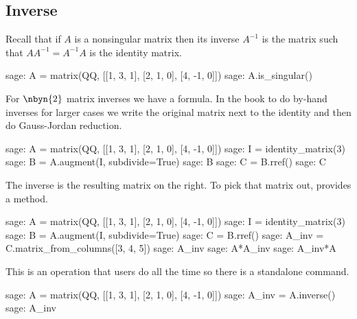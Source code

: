  


\subsection{Inverse}
Recall that if $A$ is a nonsingular matrix then its inverse $A^{-1}$
is the matrix such that $AA^{-1}=A^{-1}A$ is the identity matrix. 
\begin{sagecommandline}
sage: A = matrix(QQ, [[1, 3, 1], [2, 1, 0], [4, -1, 0]])
sage: A.is_singular()
\end{sagecommandline}
For $\nbyn{2}$ matrix inverses we have a formula.
In the book to do by-hand inverses for larger cases 
we write the original matrix next to the identity 
and then do Gauss-Jordan reduction.
\begin{sagecommandline}
sage: A = matrix(QQ, [[1, 3, 1], [2, 1, 0], [4, -1, 0]])
sage: I = identity_matrix(3)
sage: B = A.augment(I, subdivide=True)
sage: B
sage: C = B.rref()
sage: C
\end{sagecommandline}
\noindent
The inverse is the resulting matrix on the right.
To pick that matrix out, 
\Sage{} provides a  method.
\begin{sagecommandline}
sage: A = matrix(QQ, [[1, 3, 1], [2, 1, 0], [4, -1, 0]])
sage: I = identity_matrix(3)
sage: B = A.augment(I, subdivide=True)
sage: C = B.rref()
sage: A_inv = C.matrix_from_columns([3, 4, 5])
sage: A_inv
sage: A*A_inv
sage: A_inv*A
\end{sagecommandline}

This is an operation that \Sage{} users do all the time so there is a
standalone command.
\begin{sagecommandline}[d,0,1]
sage: A = matrix(QQ, [[1, 3, 1], [2, 1, 0], [4, -1, 0]])
sage: A_inv = A.inverse()
sage: A_inv
\end{sagecommandline}

